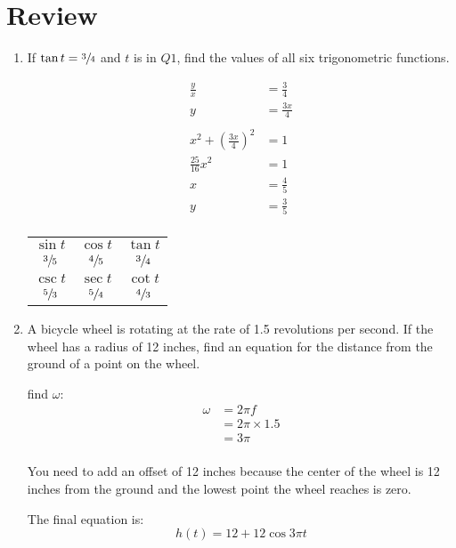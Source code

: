 \documentclass{exam}
\begin{document}
  \section{Review}
  \begin{enumerate}
    \item If $\tan t = \sfrac{3}{4}$ and $t$ is in $Q1$, find the values of all six trigonometric functions.

      \begin{solution}
        \begin{align*}
          \frac{y}{x} & = \frac{3}{4} \\
          y           & = \frac{3x}{4} \\
          \\
          x^2 + \left( \frac{3x}{4} \right)^2 &= 1 \\
          \frac{25}{16} x^2 & = 1 \\
          x                 & = \frac{4}{5} \\
          y                 & = \frac{3}{5} \\
        \end{align*}

        \begin{tabular}[H]{ccc}
          \toprule
          $\sin t$       & $\cos t$       & $\tan t$      \\
          $\sfrac{3}{5}$ & $\sfrac{4}{5}$ & $\sfrac{3}{4}$ \\

          \midrule

          $\csc t$       & $\sec t$       & $\cot t$ \\
          $\sfrac{5}{3}$ & $\sfrac{5}{4}$ & $\sfrac{4}{3}$ \\

          \bottomrule
        \end{tabular}

      \end{solution}

    \item A bicycle wheel is rotating at the rate of 1.5 revolutions per second.  If the wheel has a radius of 12
      inches, find an equation for the distance from the ground of a point on the wheel.

      \begin{solution}
        find $\omega$:
        \begin{align*}
          \omega & = 2 \pi f \\
                 & = 2 \pi \times 1.5 \\
                 & = 3 \pi \\
        \end{align*}

        You need to add an offset of 12 inches because the center of the wheel is 12 inches from the ground and the
        lowest point the wheel reaches is zero.

        The final equation is:
        \[
          h(t) = 12 + 12 \cos 3 \pi t 
        \]
      \end{solution}

  \end{enumerate}
\end{document}

